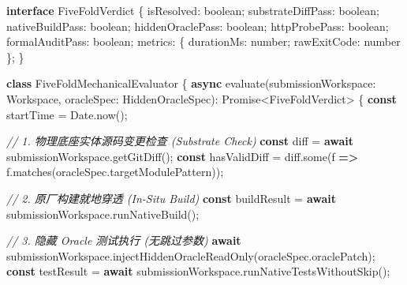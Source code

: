 \documentclass[
]{ctexart}
\newenvironment{Shaded}{}{}
\newcommand{\AttributeTok}[1]{\textcolor[rgb]{0.49,0.56,0.16}{#1}}
\newcommand{\BuiltInTok}[1]{\textcolor[rgb]{0.00,0.50,0.00}{#1}}
\newcommand{\CommentTok}[1]{\textcolor[rgb]{0.38,0.63,0.69}{\textit{#1}}}
\newcommand{\ControlFlowTok}[1]{\textcolor[rgb]{0.00,0.44,0.13}{\textbf{#1}}}
\newcommand{\DataTypeTok}[1]{\textcolor[rgb]{0.56,0.13,0.00}{#1}}
\newcommand{\FunctionTok}[1]{\textcolor[rgb]{0.02,0.16,0.49}{#1}}
\newcommand{\KeywordTok}[1]{\textcolor[rgb]{0.00,0.44,0.13}{\textbf{#1}}}
\newcommand{\NormalTok}[1]{#1}
\newcommand{\OperatorTok}[1]{\textcolor[rgb]{0.40,0.40,0.40}{#1}}
\renewcommand{\_}{\discretionary{}{}{\textunderscore}}
\begin{document}
\begin{Shaded}
\begin{Highlighting}[]
\KeywordTok{interface}\NormalTok{ FiveFoldVerdict \{}
\NormalTok{  isResolved}\OperatorTok{:} \DataTypeTok{boolean}\OperatorTok{;}
\NormalTok{  substrateDiffPass}\OperatorTok{:} \DataTypeTok{boolean}\OperatorTok{;}
\NormalTok{  nativeBuildPass}\OperatorTok{:} \DataTypeTok{boolean}\OperatorTok{;}
\NormalTok{  hiddenOraclePass}\OperatorTok{:} \DataTypeTok{boolean}\OperatorTok{;}
\NormalTok{  httpProbePass}\OperatorTok{:} \DataTypeTok{boolean}\OperatorTok{;}
\NormalTok{  formalAuditPass}\OperatorTok{:} \DataTypeTok{boolean}\OperatorTok{;}
\NormalTok{  metrics}\OperatorTok{:}\NormalTok{ \{ durationMs}\OperatorTok{:} \DataTypeTok{number}\OperatorTok{;}\NormalTok{ rawExitCode}\OperatorTok{:} \DataTypeTok{number}\NormalTok{ \}}\OperatorTok{;}
\NormalTok{\}}

\KeywordTok{class}\NormalTok{ FiveFoldMechanicalEvaluator \{}
  \KeywordTok{async} \FunctionTok{evaluate}\NormalTok{(submissionWorkspace}\OperatorTok{:}\NormalTok{ Workspace}\OperatorTok{,}\NormalTok{ oracleSpec}\OperatorTok{:}\NormalTok{ HiddenOracleSpec)}\OperatorTok{:} \BuiltInTok{Promise}\OperatorTok{\textless{}}\NormalTok{FiveFoldVerdict}\OperatorTok{\textgreater{}}\NormalTok{ \{}
    \KeywordTok{const}\NormalTok{ startTime }\OperatorTok{=} \BuiltInTok{Date}\OperatorTok{.}\FunctionTok{now}\NormalTok{()}\OperatorTok{;}

    \CommentTok{// 1. 物理底座实体源码变更检查 (Substrate Check)}
    \KeywordTok{const}\NormalTok{ diff }\OperatorTok{=} \ControlFlowTok{await}\NormalTok{ submissionWorkspace}\OperatorTok{.}\FunctionTok{getGitDiff}\NormalTok{()}\OperatorTok{;}
    \KeywordTok{const}\NormalTok{ hasValidDiff }\OperatorTok{=}\NormalTok{ diff}\OperatorTok{.}\FunctionTok{some}\NormalTok{(f }\KeywordTok{=\textgreater{}}\NormalTok{ f}\OperatorTok{.}\FunctionTok{matches}\NormalTok{(oracleSpec}\OperatorTok{.}\AttributeTok{targetModulePattern}\NormalTok{))}\OperatorTok{;}

    \CommentTok{// 2. 原厂构建就地穿透 (In{-}Situ Build)}
    \KeywordTok{const}\NormalTok{ buildResult }\OperatorTok{=} \ControlFlowTok{await}\NormalTok{ submissionWorkspace}\OperatorTok{.}\FunctionTok{runNativeBuild}\NormalTok{()}\OperatorTok{;}

    \CommentTok{// 3. 隐藏 Oracle 测试执行 (无跳过参数)}
    \ControlFlowTok{await}\NormalTok{ submissionWorkspace}\OperatorTok{.}\FunctionTok{injectHiddenOracleReadOnly}\NormalTok{(oracleSpec}\OperatorTok{.}\AttributeTok{oraclePatch}\NormalTok{)}\OperatorTok{;}
    \KeywordTok{const}\NormalTok{ testResult }\OperatorTok{=} \ControlFlowTok{await}\NormalTok{ submissionWorkspace}\OperatorTok{.}\FunctionTok{runNativeTestsWithoutSkip}\NormalTok{()}\OperatorTok{;}


\end{Highlighting}
\end{Shaded}
\end{document}
